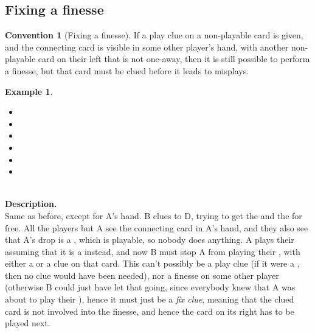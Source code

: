 \documentclass[a4paper]{article}
\theoremstyle{plain}
\theoremstyle{definition}
\newtheorem{example}[theorem]{Example}
\newtheorem{convention}[theorem]{Convention}
\begin{document}
\subsection{Fixing a finesse}

\begin{convention}[Fixing a finesse]
	\label{unfinessing}
	If a play clue on a non-playable card is given, and the connecting card is visible in some other player's hand, with another non-playable card on their left that is not one-away, then it is still possible to perform a finesse, but that card must be clued before it leads to misplays.
\end{convention}

\begin{example}	\hfill \\
	\begin{minipage}{0.45\textwidth}
		\begin{itemize}
			\item[\Large +]      
			\item[\Large A]    
			\item[\Large B]    
			\item[\Large C]     
			\item[\Large D]    
			\item[\Large E]    
		\end{itemize}
	\end{minipage}%
	\begin{minipage}{0.55\textwidth}
		\hfill \\
		
		\textbf{Description.} \\
		
		Same as before, except for A's hand. B clues  to D, trying to get the  and the  for free. All the players but A see the connecting card in A's hand, and they also see that A's drop is a , which is playable, so nobody does anything. A plays their  assuming that it is a  instead, and now B must stop A from playing their , with either a  or a  clue on that card. This can't possibly be a play clue (if it were a , then no clue would have been needed), nor a finesse on some other player (otherwise B could just have let that going, since everybody knew that A was about to play their ), hence it must just be a \emph{fix clue}, meaning that the clued card is not involved into the finesse, and hence the card on its right has to be played next.
	\end{minipage}
\end{example} \vspace{0.15 cm}
\end{document}
